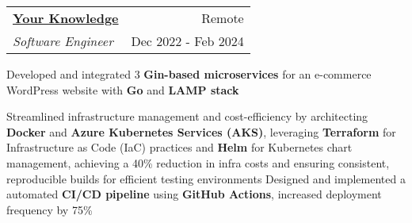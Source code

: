 \newcommand{\resumeExpEntry}[4]{
  \vspace{5pt}\item
    \begin{tabular*}{0.97\textwidth}{l@{\extracolsep{\fill}}r}
      \textbf{#1} & \small #2 \\
      \textit{#3} & \small #4 \\
    \end{tabular*}\vspace{-5pt}
}

\resumeExpEntry
{\href{https://yourknowledge.online}{Your Knowledge}}
{Remote}
{Software Engineer}
{Dec 2022 - Feb 2024}
{
  \resumeItemListStart
    \resumeItem
    {Developed and integrated 3 \textbf{Gin-based microservices} for an e-commerce WordPress website with \textbf{Go} and \textbf{LAMP stack}}
    
    \resumeItem
    {Streamlined infrastructure management and cost-efficiency by architecting \textbf{Docker} and \textbf{Azure Kubernetes Services (AKS)}, leveraging \textbf{Terraform} for Infrastructure as Code (IaC) practices and \textbf{Helm} for Kubernetes chart management, achieving a 40\% reduction in infra costs and ensuring consistent, reproducible builds for efficient testing environments}
    \resumeItem
    {Designed and implemented a automated \textbf{CI/CD pipeline} using \textbf{GitHub Actions}, increased deployment frequency by 75\%}
    
}
